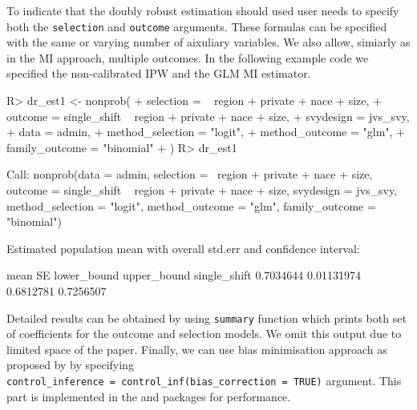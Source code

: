 \documentclass[
]{jss}
\begin{document}
To indicate that the doubly robust estimation should used user needs to
specify both the \texttt{selection} and \texttt{outcome} arguments.
These formulas can be specified with the same or varying number of
aixuliary variables. We also allow, simiarly as in the MI approach,
multiple outcomes. In the following example code we specified the
non-calibrated IPW and the GLM MI estimator.

\begin{CodeChunk}
\begin{CodeInput}
R> dr_est1 <- nonprob(
+   selection = ~ region + private + nace + size,
+   outcome = single_shift ~ region + private + nace + size,
+   svydesign = jvs_svy,
+   data = admin,
+   method_selection = "logit",
+   method_outcome = "glm",
+   family_outcome = "binomial"
+ )
R> dr_est1
\end{CodeInput}
\begin{CodeOutput}

Call:
nonprob(data = admin, selection = ~region + private + nace + 
    size, outcome = single_shift ~ region + private + nace + 
    size, svydesign = jvs_svy, method_selection = "logit", method_outcome = "glm", 
    family_outcome = "binomial")

Estimated population mean with overall std.err and confidence interval:

                  mean         SE lower_bound upper_bound
single_shift 0.7034644 0.01131974   0.6812781   0.7256507
\end{CodeOutput}
\end{CodeChunk}

Detailed results can be obtained by using \texttt{summary} function
which prints both set of coefficients for the outcome and selection
models. We omit this output due to limited space of the paper. Finally,
we can use bias minimisation approach as proposed by
\citet{yang_doubly_2020} by specifying
\texttt{control\_inference\ =\ control\_inf(bias\_correction\ =\ TRUE)}
argument. This part is implemented in the  \citep{Rcpp} and
 \citep{RcppArmadillo} packages for performance.
\end{document}
